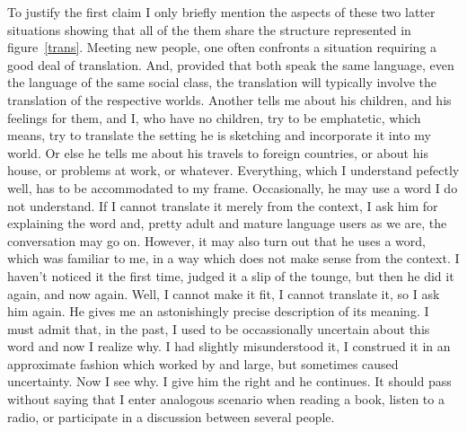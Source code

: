 \documentclass[10pt]{article}
\begin{document}
To justify the first claim I only briefly mention the aspects of these two 
latter situations showing that all of the them share the structure represented 
in figure~\ref{trans}. Meeting new people, one often confronts a situation 
requiring a good deal of translation. And, provided that both speak the 
same language, even the language of the same social class, the translation 
will typically involve the translation of the respective worlds. Another 
tells me about his children, and his feelings for them, and I, who have no 
children, try to be emphatetic, which means, try to translate the setting 
he is sketching and incorporate it into my world. Or else he tells me about
his travels to foreign countries, or about his house, or problems at work, 
or whatever. Everything, which I understand pefectly well, has to be 
accommodated to my frame. Occasionally, he may use a word I do not 
understand. If I cannot translate it merely from the context, I ask him 
for explaining the word and, pretty adult and mature language users as we 
are, the conversation may go on. However, it may also turn out that he 
uses a word, which was familiar to me, in a way which does not make sense 
from the context. I haven't noticed it the first time, judged it a slip of 
the tounge, but then he did it again, and now again. Well, I cannot make it 
fit, I cannot translate it, so I ask him again. He gives me an 
astonishingly precise description of its meaning. I must admit that, in 
the past, I used to be occassionally uncertain about this word and now I 
realize why. I had slightly misunderstood it, I construed it in an 
approximate fashion which worked by and large, but sometimes caused 
uncertainty. Now I see why. I give him the right and he continues. It 
should pass without saying that I enter analogous scenario when reading a 
book, listen to a radio, or participate in a discussion between several 
people.
\end{document}
